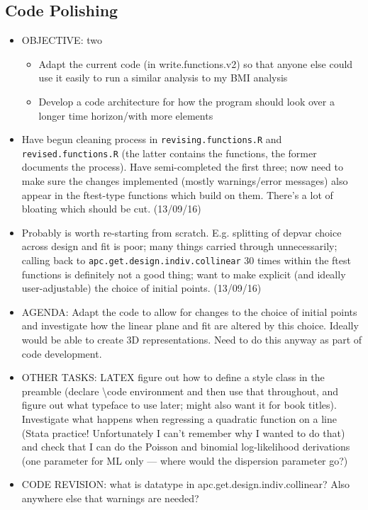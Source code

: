 \documentclass[]{article}
\begin{document}
\subsection{Code Polishing}
\begin{itemize}
\item OBJECTIVE: two 
\begin{itemize}
\item Adapt the current code (in write.functions.v2) so that anyone else could use it easily to run a similar analysis to my BMI analysis
\item Develop a code architecture for how the program should look over a longer time horizon/with more elements
\end{itemize}

\item Have begun cleaning process in \texttt{revising.functions.R} and \texttt{revised.functions.R} (the latter contains the functions, the former documents the process). Have semi-completed the first three; now need to make sure the changes implemented (mostly warnings/error messages) also appear in the ftest-type functions which build on them. There's a lot of bloating which should be cut. (13/09/16)
\item Probably is worth re-starting from scratch. E.g. splitting of depvar choice across design and fit is poor; many things carried through unnecessarily; calling back to \texttt{apc.get.design.indiv.collinear} 30 times within the ftest functions is definitely not a good thing; want to make explicit (and ideally user-adjustable) the choice of initial points. (13/09/16)

\item AGENDA: Adapt the code to allow for changes to the choice of initial points and investigate how the linear plane and fit are altered by this choice. Ideally would be able to create 3D representations. Need to do this anyway as part of code development.
\item OTHER TASKS: LATEX figure out how to define a style class in the preamble (declare \textbackslash code environment and then use that throughout, and figure out what typeface to use later; might also want it for book titles). Investigate what happens when regressing a quadratic function on a line (Stata practice! Unfortunately I can't remember why I wanted to do that) and check that I can do the Poisson and binomial log-likelihood derivations (one parameter for ML only --- where would the dispersion parameter go?)
\item CODE REVISION: what is datatype in apc.get.design.indiv.collinear? Also anywhere else that warnings are needed?
\end{itemize}
\end{document}
